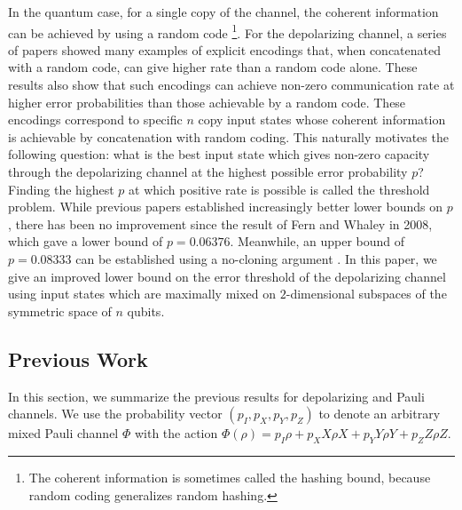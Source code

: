 \documentclass[11pt]{article}
\begin{document}
In the quantum case, for a single copy of the channel, the coherent information can be achieved by using a random code \cite{bennett1996mixed,lloyd1997capacity,shor2002quantum,devetak2005private}\footnote{The coherent information is sometimes called the hashing bound, because random coding generalizes random hashing.}. For the depolarizing channel, a series of papers \cite{divincenzo1998quantum,shor1996quantumerrorcorrectingcodesneed,smith2007degenerate,fern} showed many examples of explicit encodings that, when concatenated with a random code, can give higher rate than a random code alone. These results also show that such encodings can achieve non-zero communication rate at higher error probabilities than those achievable by a random code. These encodings correspond to specific $n$ copy input states whose coherent information is achievable by concatenation with random coding\cite{bennett1996mixed,lloyd1997capacity,shor2002quantum,devetak2005private}.  This naturally motivates the following question: what is the best input state which gives non-zero capacity through the depolarizing channel at the highest possible error probability $p$? Finding the highest $p$ at which positive rate is possible is called the threshold problem. While previous papers established increasingly better lower bounds on $p$, there has been no improvement since the result of Fern and Whaley \cite{fern} in 2008, which gave a lower bound of $p = 0.06376$. Meanwhile, an upper bound of $p=0.08333$ can be established using a no-cloning argument \cite{bruss1998optimal}. In this paper, we give an improved lower bound on the error threshold of the depolarizing channel using input states which are maximally mixed on $2$-dimensional subspaces of the symmetric space of $n$ qubits.

\subsection{Previous Work}
In this section, we summarize the previous results for depolarizing and Pauli channels. We use the probability vector $(p_I, p_X, p_Y, p_Z)$ to denote an arbitrary mixed Pauli channel $\Phi$ with the action $\Phi(\rho) = p_I \rho + p_X X \rho X + p_Y Y \rho Y + p_Z Z \rho Z$.
\end{document}
